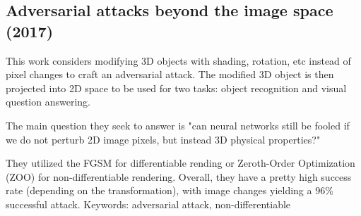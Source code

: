\documentclass{article}
\begin{document}
\subsection*{Adversarial attacks beyond the image space (2017)\cite{zeng2017adversarial}}

This work considers modifying 3D objects with shading, rotation, etc instead of pixel changes to craft an adversarial attack. The modified 3D object is then projected into 2D space to be used for two tasks: object recognition and visual question answering.

The main question they seek to answer is "can neural networks still be fooled if we do not perturb 2D image pixels, but instead 3D physical properties?"

They utilized the FGSM for differentiable rending or Zeroth-Order Optimization (ZOO) for non-differentiable rendering. Overall, they have a pretty high success rate (depending on the transformation), with image changes yielding a 96\% successful attack.
\newline\newline
Keywords: adversarial attack, non-differentiable




\end{document}
